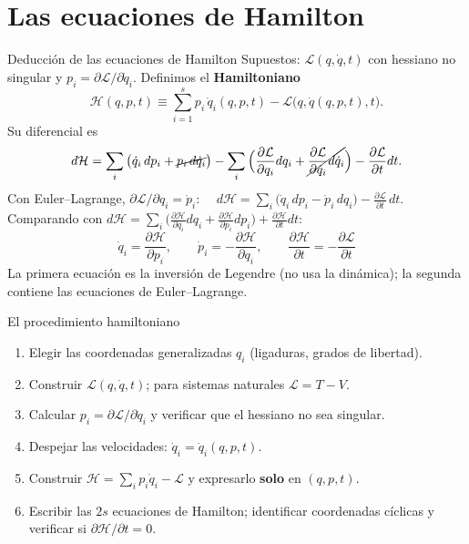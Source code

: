 \documentclass[spanish]{beamer}
\newcommand{\Lag}{\mathcal{L}}               %
\newcommand{\Ham}{\mathcal{H}}               %
\newcommand{\pd}[2]{\frac{\partial #1}{\partial #2}}
\begin{document}
\section{Las ecuaciones de Hamilton}

\begin{frame}{Deducción de las ecuaciones de Hamilton}
\small
Supuestos: $\Lag(q,\dot q,t)$ con hessiano no singular y $p_i=\partial\Lag/\partial\dot q_i$.
Definimos el \textbf{Hamiltoniano}
\[
  \Ham(q,p,t)\equiv\sum_{i=1}^s p_i\,\dot q_i(q,p,t)-\Lag\big(q,\dot q(q,p,t),t\big).
\]
\pause
Su diferencial es
\[
  d\Ham=\sum_i\big(\dot q_i\,dp_i+\cancel{p_i\,d\dot q_i}\big)
        -\sum_i\Big(\pd{\Lag}{q_i}dq_i+\cancel{\pd{\Lag}{\dot q_i}d\dot q_i}\Big)
        -\pd{\Lag}{t}dt .
\]
\pause
Con Euler--Lagrange, $\partial\Lag/\partial q_i=\dot p_i$:
$\quad d\Ham=\sum_i\big(\dot q_i\,dp_i-\dot p_i\,dq_i\big)-\pd{\Lag}{t}\,dt.$
\pause
Comparando con
$d\Ham=\sum_i\big(\pd{\Ham}{q_i}dq_i+\pd{\Ham}{p_i}dp_i\big)+\pd{\Ham}{t}dt$:
\[
  \boxed{\;\dot q_i=\pd{\Ham}{p_i},\qquad \dot p_i=-\pd{\Ham}{q_i},\qquad
  \pd{\Ham}{t}=-\pd{\Lag}{t}\;}
\]
\pause
La primera ecuación es la inversión de Legendre (no usa la dinámica);
la segunda contiene las ecuaciones de Euler--Lagrange.
\end{frame}

\begin{frame}{El procedimiento hamiltoniano}
\begin{enumerate}[<+->]
  \item Elegir las coordenadas generalizadas $q_i$ (ligaduras, grados de libertad).
  \item Construir $\Lag(q,\dot q,t)$; para sistemas naturales $\Lag=T-V$.
  \item Calcular $p_i=\partial\Lag/\partial\dot q_i$ y verificar que el hessiano no sea singular.
  \item Despejar las velocidades: $\dot q_i=\dot q_i(q,p,t)$.
  \item Construir $\Ham=\sum_i p_i\dot q_i-\Lag$ y expresarlo
        \textbf{solo} en $(q,p,t)$.
  \item Escribir las $2s$ ecuaciones de Hamilton; identificar coordenadas cíclicas
        y verificar si $\partial\Ham/\partial t=0$.
\end{enumerate}
\end{frame}
\end{document}
